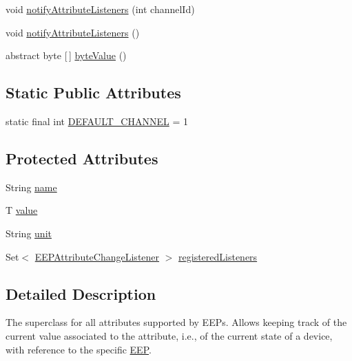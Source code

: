 \begin{DoxyCompactItemize}
\item 
void \hyperlink{classit_1_1polito_1_1elite_1_1enocean_1_1enj_1_1eep_1_1_e_e_p_attribute_ae3c284089a4cc226b48fa283068d42cf}{notify\+Attribute\+Listeners} (int channel\+Id)
\item 
void \hyperlink{classit_1_1polito_1_1elite_1_1enocean_1_1enj_1_1eep_1_1_e_e_p_attribute_a70ad35a027789d5b2d32400acfd2cff2}{notify\+Attribute\+Listeners} ()
\item 
abstract byte \mbox{[}$\,$\mbox{]} \hyperlink{classit_1_1polito_1_1elite_1_1enocean_1_1enj_1_1eep_1_1_e_e_p_attribute_abfcf99b7c3b1a3681b28a910ca1f3658}{byte\+Value} ()
\end{DoxyCompactItemize}
\subsection*{Static Public Attributes}
\begin{DoxyCompactItemize}
\item 
static final int \hyperlink{classit_1_1polito_1_1elite_1_1enocean_1_1enj_1_1eep_1_1_e_e_p_attribute_a309e82ccacbf9b1618041ff8ee8eea41}{D\+E\+F\+A\+U\+L\+T\+\_\+\+C\+H\+A\+N\+N\+EL} = 1
\end{DoxyCompactItemize}
\subsection*{Protected Attributes}
\begin{DoxyCompactItemize}
\item 
String \hyperlink{classit_1_1polito_1_1elite_1_1enocean_1_1enj_1_1eep_1_1_e_e_p_attribute_a1027c0dda631c419cfecf58a8790f61c}{name}
\item 
T \hyperlink{classit_1_1polito_1_1elite_1_1enocean_1_1enj_1_1eep_1_1_e_e_p_attribute_af4d7e34642004bb6ccfae51e925c983d}{value}
\item 
String \hyperlink{classit_1_1polito_1_1elite_1_1enocean_1_1enj_1_1eep_1_1_e_e_p_attribute_a3fe5b3d613c30066354ad66eeb23b8ae}{unit}
\item 
Set$<$ \hyperlink{interfaceit_1_1polito_1_1elite_1_1enocean_1_1enj_1_1eep_1_1_e_e_p_attribute_change_listener}{E\+E\+P\+Attribute\+Change\+Listener} $>$ \hyperlink{classit_1_1polito_1_1elite_1_1enocean_1_1enj_1_1eep_1_1_e_e_p_attribute_a4e719778053ed153c1382569278b7bd7}{registered\+Listeners}
\end{DoxyCompactItemize}


\subsection{Detailed Description}
The superclass for all attributes supported by E\+E\+Ps. Allows keeping track of the current value associated to the attribute, i.\+e., of the current state of a device, with reference to the specific \hyperlink{classit_1_1polito_1_1elite_1_1enocean_1_1enj_1_1eep_1_1_e_e_p}{E\+EP}.

